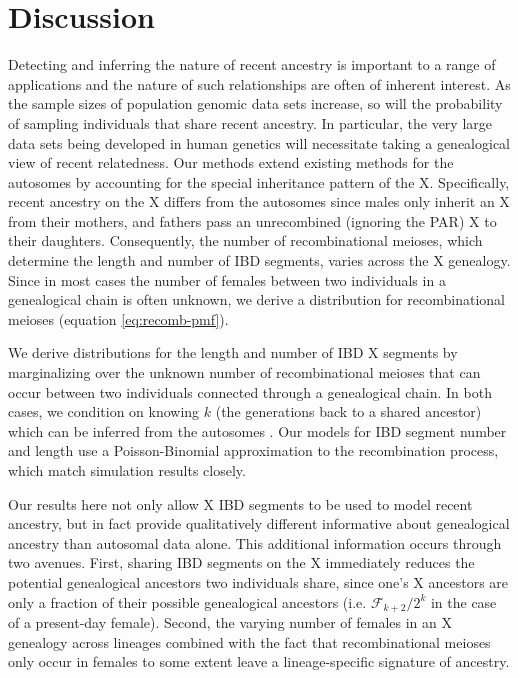 \documentclass[11pt]{article}
\begin{document}
\section{Discussion}

Detecting and inferring the nature of recent ancestry is important to a range
of applications and the nature of such relationships are often of inherent
interest.  As the sample sizes of population genomic data sets increase, so
will the probability of sampling individuals that share recent ancestry. In
particular, the very large data sets being developed in human genetics will
necessitate taking a genealogical view of recent relatedness.  Our methods
extend existing methods for the autosomes by accounting for the special
inheritance pattern of the X. Specifically, recent ancestry on the X differs
from the autosomes since males only inherit an X from their mothers, and
fathers pass an unrecombined (ignoring the PAR) X to their daughters.
Consequently, the number of recombinational meioses, which determine the length
and number of IBD segments, varies across the X genealogy. Since in most cases
the number of females between two individuals in a genealogical chain is often
unknown, we derive a distribution for recombinational meioses (equation
\eqref{eq:recomb-pmf}).

We derive distributions for the length and number of IBD X segments by
marginalizing over the unknown number of recombinational meioses that can occur
between two individuals connected through a genealogical chain. In both cases,
we condition on knowing $k$ (the generations back to a shared ancestor) which
can be inferred from the autosomes \citep{huff2011maximum}. Our models for IBD
segment number and length use a Poisson-Binomial approximation to the
recombination process, which match simulation results closely.

Our results here not only allow X IBD segments to be used to model recent
ancestry, but in fact provide qualitatively different informative about
genealogical ancestry than autosomal data alone. This additional information
occurs through two avenues. First, sharing IBD segments on the X immediately
reduces the potential genealogical ancestors two individuals share, since one's
X ancestors are only a fraction of their possible genealogical ancestors (i.e.
$\mathcal{F}_{k+2}/2^{k}$ in the case of a present-day female). Second, the
varying number of females in an X genealogy across lineages combined with the
fact that recombinational meioses only occur in females to some extent leave a
lineage-specific signature of ancestry.
\end{document}
